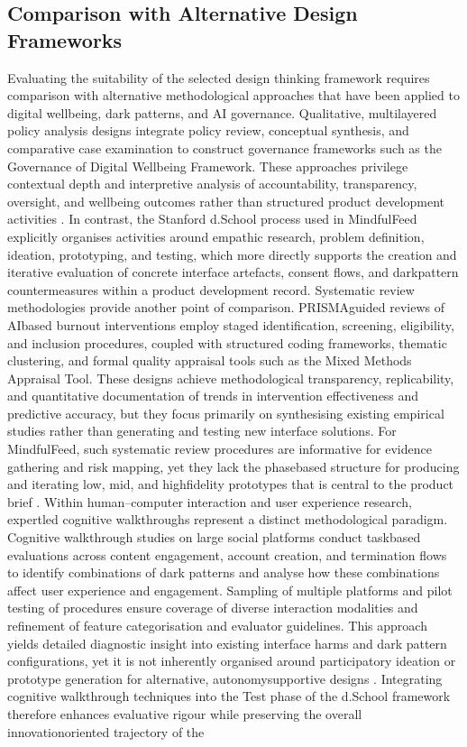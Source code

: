 \documentclass{article}
\begin{document}
\subsection{Comparison with Alternative Design Frameworks}
\label{sec:comparison_alt_frameworks} Evaluating the suitability of the selected design thinking framework requires comparison with alternative methodological approaches that have been applied to digital well\-being, dark patterns, and AI governance. Qualitative, multi\-layered policy analysis designs integrate policy review, conceptual synthesis, and comparative case examination to construct governance frameworks such as the Governance of Digital Well\-being Framework. These approaches privilege contextual depth and interpretive analysis of accountability, transparency, oversight, and well\-being outcomes rather than structured product development activities \parencites[7]{7808872}[8]{7808872}. In contrast, the Stanford d.School process used in MindfulFeed explicitly organises activities around empathic research, problem definition, ideation, prototyping, and testing, which more directly supports the creation and iterative evaluation of concrete interface artefacts, consent flows, and dark\-pattern countermeasures within a product development record. Systematic review methodologies provide another point of comparison. PRISMA\-guided reviews of AI\-based burnout interventions employ staged identification, screening, eligibility, and inclusion procedures, coupled with structured coding frameworks, thematic clustering, and formal quality appraisal tools such as the Mixed Methods Appraisal Tool. These designs achieve methodological transparency, replicability, and quantitative documentation of trends in intervention effectiveness and predictive accuracy, but they focus primarily on synthesising existing empirical studies rather than generating and testing new interface solutions. For MindfulFeed, such systematic review procedures are informative for evidence gathering and risk mapping, yet they lack the phase\-based structure for producing and iterating low\-, mid\-, and high\-fidelity prototypes that is central to the product brief \parencites[19]{8760542}. Within human--computer interaction and user experience research, expert\-led cognitive walkthroughs represent a distinct methodological paradigm. Cognitive walkthrough studies on large social platforms conduct task\-based evaluations across content engagement, account creation, and termination flows to identify combinations of dark patterns and analyse how these combinations affect user experience and engagement. Sampling of multiple platforms and pilot testing of procedures ensure coverage of diverse interaction modalities and refinement of feature categorisation and evaluator guidelines. This approach yields detailed diagnostic insight into existing interface harms and dark pattern configurations, yet it is not inherently organised around participatory ideation or prototype generation for alternative, autonomy\-supportive designs \parencites[2]{4692551}[3]{4692551}. Integrating cognitive walkthrough techniques into the Test phase of the d.School framework therefore enhances evaluative rigour while preserving the overall innovation\-oriented trajectory of the 
\end{document}
